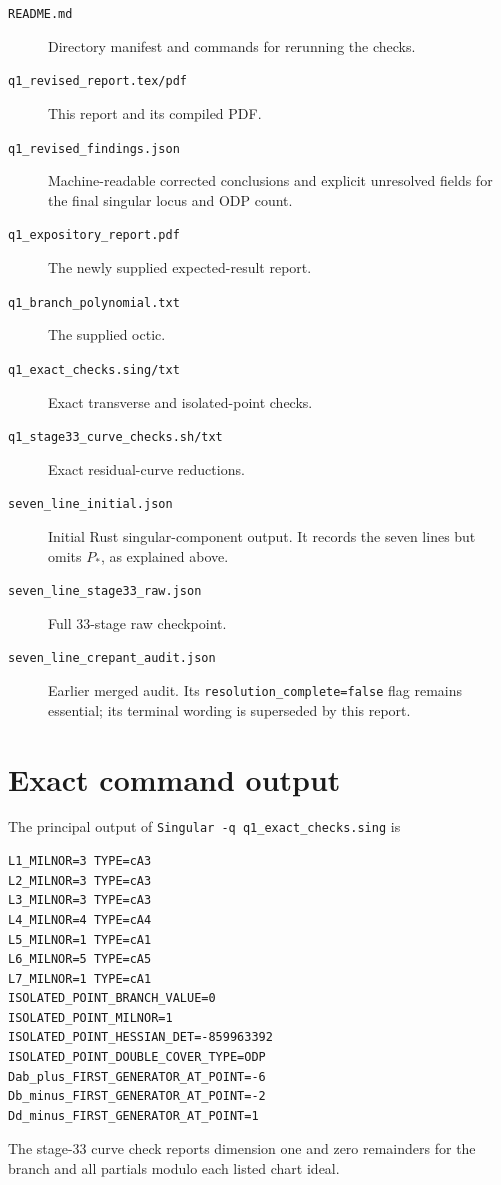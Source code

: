 \documentclass[11pt]{article}
\begin{document}
\begin{description}
  \item[\texttt{README.md}] Directory manifest and commands for rerunning the checks.
  \item[\texttt{q1\_revised\_report.tex/pdf}] This report and its compiled PDF.
  \item[\texttt{q1\_revised\_findings.json}] Machine-readable corrected conclusions and
  explicit unresolved fields for the final singular locus and ODP count.
  \item[\texttt{q1\_expository\_report.pdf}] The newly supplied expected-result report.
  \item[\texttt{q1\_branch\_polynomial.txt}] The supplied octic.
  \item[\texttt{q1\_exact\_checks.sing/txt}] Exact transverse and isolated-point checks.
  \item[\texttt{q1\_stage33\_curve\_checks.sh/txt}] Exact residual-curve reductions.
  \item[\texttt{seven\_line\_initial.json}] Initial Rust singular-component output.  It records
  the seven lines but omits $P_*$, as explained above.
  \item[\texttt{seven\_line\_stage33\_raw.json}] Full 33-stage raw checkpoint.
  \item[\texttt{seven\_line\_crepant\_audit.json}] Earlier merged audit.  Its
  \texttt{resolution\_complete=false} flag remains essential; its terminal wording is
  superseded by this report.
\end{description}

\appendix
\section{Exact command output}

The principal output of \texttt{Singular -q q1\_exact\_checks.sing} is
\begin{verbatim}
L1_MILNOR=3 TYPE=cA3
L2_MILNOR=3 TYPE=cA3
L3_MILNOR=3 TYPE=cA3
L4_MILNOR=4 TYPE=cA4
L5_MILNOR=1 TYPE=cA1
L6_MILNOR=5 TYPE=cA5
L7_MILNOR=1 TYPE=cA1
ISOLATED_POINT_BRANCH_VALUE=0
ISOLATED_POINT_MILNOR=1
ISOLATED_POINT_HESSIAN_DET=-859963392
ISOLATED_POINT_DOUBLE_COVER_TYPE=ODP
Dab_plus_FIRST_GENERATOR_AT_POINT=-6
Db_minus_FIRST_GENERATOR_AT_POINT=-2
Dd_minus_FIRST_GENERATOR_AT_POINT=1
\end{verbatim}

The stage-33 curve check reports dimension one and zero remainders for the branch and all
partials modulo each listed chart ideal.
\end{document}
